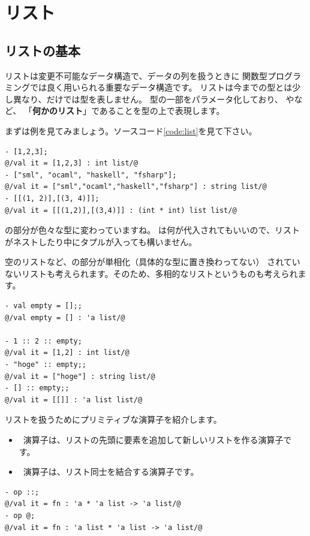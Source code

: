 \documentclass[11pt,a4paper]{jarticle}
\begin{document}
\label{sec:list}
\section{リスト}
\subsection{リストの基本}
リストは変更不可能なデータ構造で、データの列を扱うときに
関数型プログラミングでは良く用いられる重要なデータ構造です。
リストは今までの型とは少し異なり、だけでは型を表しません。
型の一部をパラメータ化しており、
やなど、
「{\bfseries 何かのリスト}」であることを型の上で表現します。

まずは例を見てみましょう。ソースコード\ref{code:list}を見て下さい。

\begin{lstlisting}[caption=色々なリスト,label=code:list]
- [1,2,3];
@/val it = [1,2,3] : int list/@
- ["sml", "ocaml", "haskell", "fsharp"];
@/val it = ["sml","ocaml","haskell","fsharp"] : string list/@
- [[(1, 2)],[(3, 4)]];
@/val it = [[(1,2)],[(3,4)]] : (int * int) list list/@
\end{lstlisting}

の部分が色々な型に変わっていますね。
は何が代入されてもいいので、リストがネストしたり中にタプルが入っても構いません。

空のリストなど、の部分が単相化（具体的な型に置き換わってない）
されていないリストも考えられます。そのため、多相的なリストというものも考えられます。

\begin{lstlisting}[caption=多相的なリスト,label=code:poly-list]
- val empty = [];;
@/val empty = [] : 'a list/@

- 1 :: 2 :: empty;
@/val it = [1,2] : int list/@
- "hoge" :: empty;;
@/val it = ["hoge"] : string list/@
- [] :: empty;;
@/val it = [[]] : 'a list list/@
\end{lstlisting}

リストを扱うためにプリミティブな演算子を紹介します。
\begin{itemize}
\item \prog{::} \ 演算子は、リストの先頭に要素を追加して新しいリストを作る演算子です。
\item {} \ 演算子は、リスト同士を結合する演算子です。
\end{itemize}

\begin{lstlisting}[caption=リスト操作演算子の型,label=code:list-operators]
- op ::;
@/val it = fn : 'a * 'a list -> 'a list/@
- op @;
@/val it = fn : 'a list * 'a list -> 'a list/@
\end{lstlisting}
\end{document}
